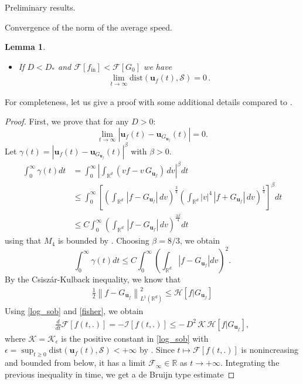\documentclass[reqno]{amsart} %
\newtheorem{lemma}{Lemma}[section]
\begin{document}
\begin{section}{Preliminary results.}
\begin{subsection}{Convergence of the norm of the average speed.}
\begin{lemma}
\begin{itemize}
\item If $D<D_*$ and $\mathcal{F}[f_{\mathrm{in}}]<\mathcal{F}[G_{0}]$ we have
     \begin{align*}
         \lim_{t \rightarrow{\infty}} \mathrm{dist}(\mathbf{u}_{f}(t),\mathcal{S})=0\,.
     \end{align*}
     \end{itemize}
\end{lemma}
For completeness, let us give a proof with some additional details compared to \cite{Li2021}.
\begin{proof}
    First, we prove that for any $D>0$:
      $$\lim_{t\rightarrow \infty}|\mathbf{u}_{f}(t)-\mathbf{u}_{G_{\mathbf{u}_{f}}}(t)| =0.$$
 Let $\gamma(t)= |\mathbf{u}_{f}(t)-\mathbf{u}_{G_{\mathbf{u}_{f}}}(t)|^{\beta}$ with $\beta>0$.
    \begin{align*}
        \int_{0}^{\infty} \gamma(t)dt &= \int_{0}^{\infty} \left| \int_{\mathbb{R}^d}(vf -v\,G_{\mathbf{u}_{f}})\,dv \right|^{\beta}dt \\& \leq\int_{0}^{\infty} \left[  \left(\int_{\mathbb{R}^d} \,|f-G_{\mathbf{u}_{f}}|\,dv \right)^{\frac{3}{4}} \left(\int_{\mathbb{R}^d} |v|^4\,|f+G_{\mathbf{u}_{f}}|\,dv \right)^{\frac{1}{4}}\right]^{\beta}dt \\&\leq C \int_{0}^{\infty}  \left(\int_{\mathbb{R}^d}\, |f-G_{\mathbf{u}_{f}}|\,dv \right)^{\frac{3\beta}{4}}dt
    \end{align*}
using that $M_4$ is bounded by .
Choosing $\beta = 8/3$, we obtain
\begin{equation}
\label{eq0}
     \int_{0}^{\infty} \gamma(t)dt \leq  C \int_{0}^{\infty}  \left(\int_{\mathbb{R}^d} |f-G_{\mathbf{u}_{f}}|dv \right)^{2}.
\end{equation}
By the Csiszár-Kulback inequality, we know that 
\begin{align}
\tag{C-K}\label{eq100}
    \frac{1}{2} \left\| f - G_{\mathbf{u}_{f}} \right\|^2_{L^1(\mathbb{R}^d)} \leq \mathcal{H}[f | G_{\mathbf{u}_{f}}]
\end{align}
Using  \eqref{log_sob} and \eqref{fisher}, we obtain
\begin{align*}
    \frac{d}{dt} \mathcal{F}[f(t,.)]=-\mathcal{I}[f(t,.)]\leq -\,D^2 \,\mathcal{K}\, \mathcal{H}[f|G_{\mathbf{u}_{f}}],
\end{align*}
where $\mathcal{K}=\mathcal{K}_{\epsilon}$ is the positive constant in \eqref{log_sob} with $\epsilon=\sup_{t \geq 0}\mathrm{dist}(\mathbf{u}_{f}(t),\mathcal{S})<+\infty$ by . 
Since $t \mapsto \mathcal{F}[f(t,.)]$ is nonincreasing and bounded from below, it has a limit $\mathcal{F}_{\infty} \in \mathbb{R}$ as $t \rightarrow+\infty$. Integrating the previous inequality in time, we get a de Bruijn type estimate

\end{proof}
\end{subsection}
\end{section}
\end{document}
